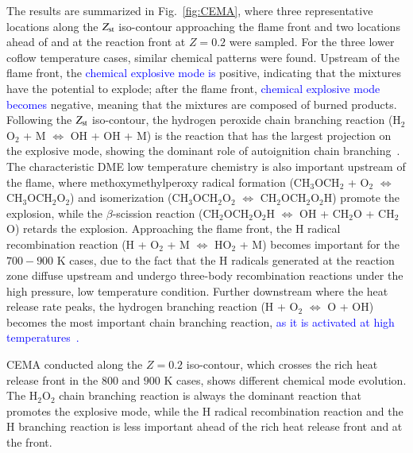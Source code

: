 \documentclass[review,3p,times]{elsarticle}
\begin{document}
The results are summarized in Fig.~\ref{fig:CEMA}, where three representative locations along the $Z_{\rm st}$ iso-contour approaching the flame front and two locations ahead of and at the reaction front at $Z = 0.2$ were sampled.  For the three lower coflow temperature cases, similar chemical patterns were found.  Upstream of the flame front, the \textcolor{blue}{chemical explosive mode is} positive, indicating that the mixtures have the potential to explode; after the flame front, \textcolor{blue}{chemical explosive mode becomes} negative, meaning that the mixtures are composed of burned products.  Following the $Z_{\rm st}$ iso-contour, the hydrogen peroxide chain branching reaction (H$_2$O$_2$ + M $\Longleftrightarrow$ OH + OH + M) is the reaction that has the largest projection on the explosive mode, showing the dominant role of autoignition chain branching\textcolor{blue}{~\cite{westbrook00}}.  The characteristic DME low temperature chemistry is also important upstream of the flame, where methoxymethylperoxy radical formation (CH$_3$OCH$_2$ + O$_2$ $\Longleftrightarrow$ CH$_3$OCH$_2$O$_2$) and isomerization (CH$_3$OCH$_2$O$_2$ $\Longleftrightarrow$ CH$_2$OCH$_2$O$_2$H) promote the explosion, while the $\beta$-scission reaction (CH$_2$OCH$_2$O$_2$H $\Longleftrightarrow$ OH + CH$_2$O + CH$_2$O) retards the explosion.  Approaching the flame front, the H radical recombination reaction (H + O$_2$ + M $\Longleftrightarrow$ HO$_2$ + M) becomes important for the $700-900$ K cases, due to the fact that the H radicals generated at the reaction zone diffuse upstream and undergo three-body recombination reactions under the high pressure, low temperature condition.  Further downstream where the heat release rate peaks, the hydrogen branching reaction (H + O$_2$ $\Longleftrightarrow$ O + OH) becomes the most important chain branching reaction, \textcolor{blue}{as it is activated at high temperatures~\cite{westbrook00}.}


CEMA conducted along the $Z = 0.2$ iso-contour, which crosses the rich heat release front in the $800$ and $900$ K cases, shows different chemical mode evolution.  The H$_2$O$_2$ chain branching reaction is always the dominant reaction that promotes the explosive mode, while the H radical recombination reaction and the H branching reaction is less important ahead of the rich heat release front and at the front.  
\end{document}
